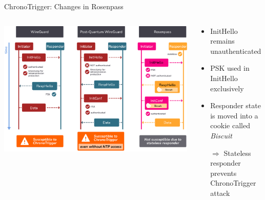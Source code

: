 \begin{frame}{ChronoTrigger: Changes in Rosenpass}
  \begin{columns}[fullwidth,c]
    \begin{column}{.64\linewidth}
      \includegraphics[keepaspectratio,width=\linewidth]{graphics/chronotrigger-compare.pdf}
    \end{column}%
    \begin{column}{.3\linewidth}
      \begin{itemize}
        \item InitHello remains unauthenticated
        \item PSK used in InitHello exclusively
        \item Responder state is moved into a cookie called \emph{Biscuit}
        \item[$\Rightarrow$] Stateless responder prevents ChronoTrigger attack
      \end{itemize}
    \end{column}
  \end{columns}
\end{frame}

